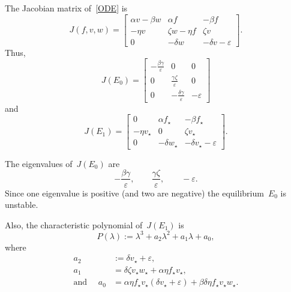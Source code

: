 \documentclass[12pt]{amsart}
\renewcommand{\epsilon}{\varepsilon}
\numberwithin{equation}{section}
\begin{document}
The Jacobian matrix of~\eqref{ODE} is
\[
J(f,v,w) =
\begin{bmatrix}
\alpha v - \beta w  & \alpha f & -\beta f \\
- \eta v & \zeta w - \eta f & \zeta v\\
0 & -\delta w & -\delta v - \epsilon
\end{bmatrix}.
\]
Thus,
\[
J (E_0)=
\begin{bmatrix}
- \frac{\beta \gamma}{\epsilon} & 0 & 0 \\
0 & \frac{\gamma\zeta}{\epsilon}&0\\
0 & - \frac{\delta \gamma}{\epsilon}& -\epsilon 
\end{bmatrix}
\]
and
\begin{equation}\label{JE1}
J(E_1) =
\begin{bmatrix}
0 & \alpha f_\star & -\beta f_\star\\
-\eta v_\star & 0 & \zeta v_\star\\
0 & -\delta w_\star & -\delta v_\star - \epsilon
\end{bmatrix}.
\end{equation}

The eigenvalues of~$J(E_0)$ are
$$ -\frac{\beta \gamma}{\epsilon},\qquad
\frac{\gamma\zeta}{\epsilon},\qquad-\epsilon.$$
Since one eigenvalue is positive
(and two are negative)
the equilibrium~$E_0$ is unstable.

Also, the characteristic polynomial of~$J(E_1)$ is
\[P(\lambda):=
\lambda^3 + a_2 \lambda^2 + a_1 \lambda + a_0 ,
\]
where
\begin{equation}\label{0jdocwg-21rtghb:001}
\begin{split}
a_2 &:= \delta v_\star + \epsilon, \\
a_1 &=  \delta\zeta v_\star w_\star + \alpha \eta f_\star v_\star, \\ {\mbox{and }}\quad
a_0 &= \alpha \eta f_\star v_\star (\delta v_\star + \epsilon) + \beta \delta \eta f_\star v_\star w_\star.
\end{split}\end{equation}
\end{document}
